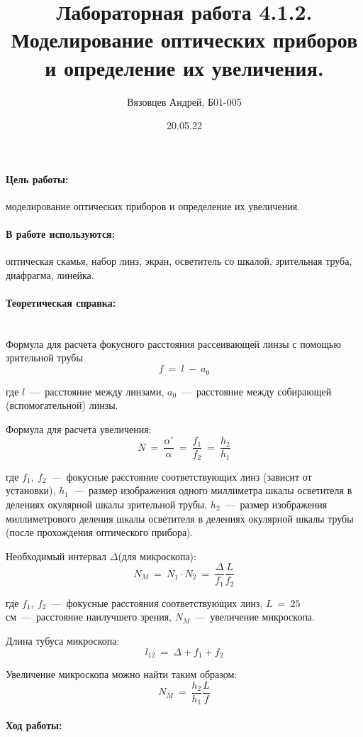 \documentclass[a4paper, 12pt]{article}
\author{Вязовцев Андрей, Б01-005}
\date{20.05.22}
\title{Лабораторная работа 4.1.2. Моделирование оптических приборов и определение их увеличения.}
\newcommand{\parag}[1]{\paragraph*{#1:}}
\begin{document}
\maketitle

\parag {Цель работы} моделирование оптических приборов и определение их увеличения.

\parag {В работе используются} оптическая скамья, набор линз, экран, осветитель со шкалой, зрительная труба, диафрагма, линейка.

\parag {Теоретическая справка} ~\\

Формула для расчета фокусного расстояния рассеивающей линзы с помощью зрительной трубы
\begin{equation}
	\label{eq1}
	f~=~l~-~a_0
\end{equation}

где $l$~---~расстояние между линзами, $a_0$~---~расстояние между собирающей (вспомогательной) линзы.

Формула для расчета увеличения:
\begin{equation}
	\label{eq2}
	N~=~\dfrac{\alpha'}{\alpha}~=~\dfrac{f_1}{f_2}~=~\dfrac{h_2}{h_1}
\end{equation}

где $f_1,~f_2$~---~фокусные расстояние соответствующих линз (зависит от установки), $h_1$~---~размер изображения одного миллиметра шкалы осветителя в делениях окулярной шкалы зрительной трубы, $h_2$~---~размер изображения миллиметрового деления шкалы осветителя в делениях окулярной шкалы трубы (после прохождения оптического прибора).

Необходимый интервал $\Delta$(для микроскопа):
\begin{equation}
	\label{eq3}
	N_M~=~N_1 \cdot N_2~=~\dfrac{\Delta}{f_1} \dfrac{L}{f_2} 
\end{equation}

где $f_1,~f_2$~---~фокусные расстояния соответствующих линз, $L~=~25$ см~---~расстояние наилучшего зрения, $N_M$~---~увеличение микроскопа.

Длина тубуса микроскопа:
\begin{equation}
	\label{eq4}
	l_{12}~=~\Delta + f_1 + f_2
\end{equation}

Увеличение микроскопа можно найти таким образом:
\begin{equation}
	\label{eq5}
	N_M~=~\dfrac{h_2}{h_1} \dfrac{L}{f}
\end{equation}

\parag {Ход работы} ~\\
\end{document}
